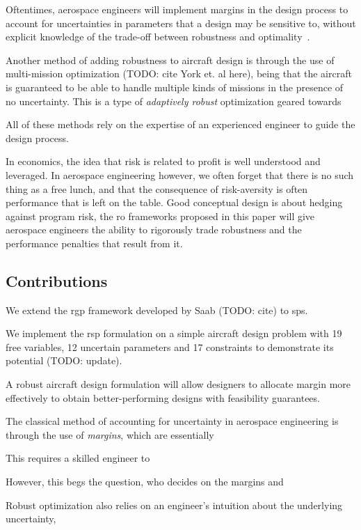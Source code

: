 Oftentimes, aerospace engineers will implement
margins in the design process to account for uncertainties in parameters that a design may be sensitive to,
without explicit knowledge of the trade-off between robustness and optimality~\cite{yao2011}.

Another method of adding robustness to aircraft design is through the use of multi-mission
optimization (TODO: cite York et. al here), being that the aircraft is guaranteed to be able to handle
multiple kinds of missions in the presence of no uncertainty. This is a type of \textit{adaptively
robust} optimization geared towards

All of these methods rely on the expertise of an experienced engineer to guide the design process.

In economics, the idea that risk is related to profit is well understood and leveraged.
In aerospace engineering however, we often forget that there is no such thing as a free lunch,
and that the consequence of risk-aversity
is often performance that is left on the table. Good conceptual design is about hedging against program risk,
the \gls{ro} frameworks proposed in this paper will
give aerospace engineers the ability to rigorously trade robustness and the performance penalties
that result from it.

\subsection{Contributions}

We extend the \gls{rgp} framework developed by Saab (TODO: cite) to \gls{sp}s.

We implement the \gls{rsp} formulation on a simple aircraft design problem with 19 free variables,
12 uncertain parameters and 17 constraints to demonstrate its potential (TODO: update).

A robust aircraft design formulation will allow designers to allocate margin more effectively
to obtain better-performing designs with feasibility guarantees.


The classical method of accounting for uncertainty in aerospace engineering is through
the use of \textit{margins}, which are essentially

This requires a skilled engineer to

However, this begs the question, who decides on the margins and

Robust optimization also relies on an engineer's intuition about the underlying uncertainty,

